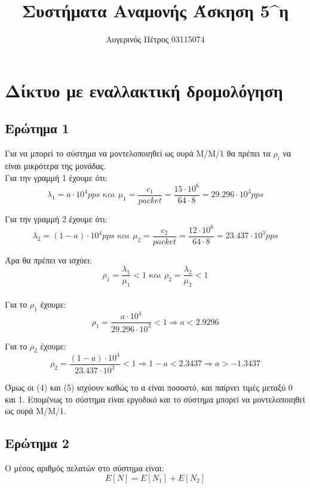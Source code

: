 \documentclass[12pt]{article}
\author{Αυγερινός Πέτρος 03115074}
\title{Συστήματα Αναμονής Άσκηση 5^η}
\date{}
\begin{document}
\maketitle 
\pagebreak

\tableofcontents
\pagebreak

\section{Δίκτυο με εναλλακτική δρομολόγηση}
\subsection{Ερώτημα 1}
Για να μπορεί το σύστημα να μοντελοποιηθεί ως ουρά M/M/1 θα πρέπει τα $\rho_i$ να 
είναι μικρότερα της μονάδας.\\

Για την γραμμή 1 έχουμε ότι: 
\begin{equation}
    \lambda_1 = a \cdot 10^4 pps \text{ και } \mu_1 = \frac{c_1}{packet} = \frac{15 \cdot 10^6}{64 \cdot 8} = 29.296 \cdot 10^3 pps
\end{equation}

Για την γραμμή 2 έχουμε ότι: 
\begin{equation}
    \lambda_2 = (1-a) \cdot 10^4 pps \text{ και } \mu_2 = \frac{c_2}{packet} = \frac{12 \cdot 10^6}{64 \cdot 8} = 23.437 \cdot 10^3 pps
\end{equation}

Άρα θα πρέπει να ισχύει: 
\begin{equation}
    \rho_1 = \frac{\lambda_1}{\mu_1} < 1 \text{ και } \rho_2 = \frac{\lambda_2}{\mu_2} < 1
\end{equation}
\\

Για το $\rho_1$ έχουμε:
\begin{equation}
    \rho_1 = \frac{a \cdot 10^4}{29.296 \cdot 10^3} < 1 \Rightarrow a < 2.9296
\end{equation}

Για το $\rho_2$ έχουμε:
\begin{equation}
    \rho_2 = \frac{(1-a) \cdot 10^4}{23.437 \cdot 10^3} < 1 \Rightarrow 1-a < 2.3437 \Rightarrow a > -1.3437
\end{equation}

Όμως οι (4) και (5) ισχύουν καθώς το α είναι ποσοστό, και παίρνει τιμές μεταξύ 0 και 1. Επομένως το σύστημα είναι 
εργοδικό και το σύστημα μπορεί να μοντελοποιηθεί ως ουρά M/M/1.

\subsection{Ερώτημα 2}
Ο μέσος αριθμός πελατών στο σύστημα είναι: 
\begin{equation}
    Ε[N] = E[N_1] + E[N_2]
\end{equation}
\end{document}
